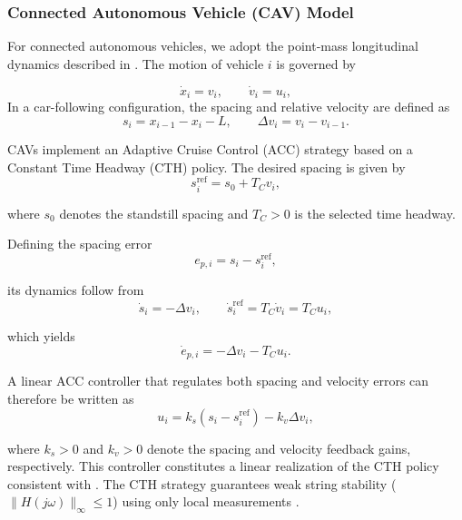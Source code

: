 \subsubsection{Connected Autonomous Vehicle (CAV) Model}\label{CAV}

For connected autonomous vehicles, we adopt the point-mass longitudinal dynamics described in \cite{Mirabilio.2023}. The motion of vehicle $i$ is governed by

\begin{equation}
\dot{x}_i = v_i,
\qquad
\dot{v}_i = u_i,
\end{equation}
In a car-following configuration, the spacing and relative velocity are defined as
\begin{equation}
s_i = x_{i-1} - x_i - L,
\qquad
\Delta v_i = v_i - v_{i-1}.
\end{equation}

CAVs implement an Adaptive Cruise Control (ACC) strategy based on a Constant Time Headway (CTH) policy. The desired spacing is given by
\begin{equation}
s_i^{\mathrm{ref}} = s_0 + T_C v_i,
\end{equation}

where $s_0$ denotes the standstill spacing and $T_C > 0$ is the selected time headway.

Defining the spacing error
\begin{equation}
e_{p,i} = s_i - s_i^{\mathrm{ref}},
\end{equation}

its dynamics follow from
\begin{equation}
\dot{s}_i = -\Delta v_i,
\qquad
\dot{s}_i^{\mathrm{ref}} = T_C \dot{v}_i = T_C u_i,
\end{equation}

which yields
\begin{equation}
\dot{e}_{p,i} = -\Delta v_i - T_C u_i.
\end{equation}

A linear ACC controller that regulates both spacing and velocity errors can therefore be written as
\begin{equation}
u_i =
k_s ( s_i - s_i^{\mathrm{ref}} )
-
k_v \Delta v_i,
\end{equation}

where $k_s > 0$ and $k_v > 0$ denote the spacing and velocity feedback gains, respectively. This controller constitutes a linear realization of the CTH policy consistent with \cite{Mirabilio.2023}. The CTH strategy guarantees weak string stability ($\| H(j\omega) \|_{\infty} \le 1$) using only local measurements \cite{Swaroop.2001}.